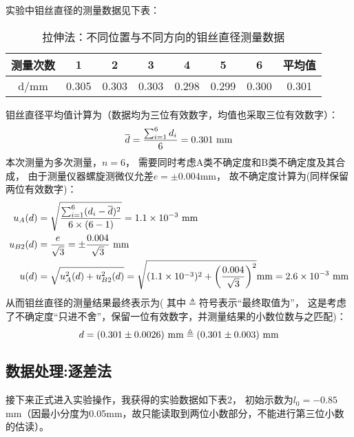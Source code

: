 \documentclass[11pt]{article}
\begin{document}
实验中钼丝直径的测量数据见下表：
\begin{table}[H]
    \centering
    \begin{tabular}{cccccccc}
    \toprule
        测量次数 & 1 & 2 & 3 & 4 & 5 & 6 & 平均值 \\ 
    \midrule
        d/mm & 0.305 & 0.303 & 0.303 & 0.298 & 0.299 & 0.300 & 0.301 \\ 
    \bottomrule
    \end{tabular}
    \caption{拉伸法：不同位置与不同方向的钼丝直径测量数据}
\end{table}
钼丝直径平均值计算为（数据均为三位有效数字，均值也采取三位有效数字）：
\[
   \overline d =\frac{\sum_{i=1}^6 d_i}{6}=0.301\,\, {\rm mm}
\]
本次测量为多次测量，$n=6$，
需要同时考虑A类不确定度和B类不确定度及其合成，
由于测量仪器螺旋测微仪允差$e=\pm 0.004$mm，
故不确定度计算为(同样保留两位有效数字)：
\begin{align*}
     u_A(d)&=\sqrt{\frac{\sum_{i=1}^6(d_i-\overline d)^2}{6\times(6-1)}}=1.1\times10^{-3}\,\,{\rm mm}\\
    u_{B2}(d)& =\frac{e}{\sqrt 3}=\pm \frac{0.004}{\sqrt 3} \,\,{\rm mm}\\
    u(d) &=
    \sqrt{u_{A}^2(d)+u^2_{B2}(d)} =\sqrt{(1.1\times10^{-3})^2+\left(\frac{0.004}{\sqrt3 }\right)^2}{\rm mm}
    =2.6\times 10^{-3} \,\,{\rm mm}
\end{align*}
从而钼丝直径的测量结果最终表示为(
    其中$\triangleq$符号表示“最终取值为”，
    这是考虑了不确定度“只进不舍”，保留一位有效数字，并测量结果的小数位数与之匹配)：
\[
   d= (0.301\pm 0.0026)\,\,{\rm mm}\triangleq(0.301\pm 0.003)\,\,{\rm mm}
\]










\subsection{数据处理:逐差法}
接下来正式进入实验操作，我获得的实验数据如下表2，
初始示数为$l_0=-0.85$mm（因最小分度为0.05mm，故只能读取到两位小数部分，不能进行第三位小数的估读）。
\end{document}
